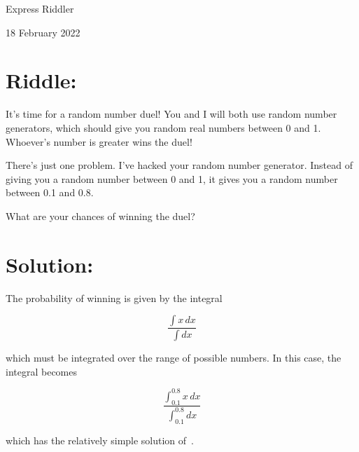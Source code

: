 \documentclass{article}
\begin{document}
\pagestyle{empty} %

\begin{center}
{\LARGE Express Riddler}

\vspace{0.15in}

{\Large 18 February 2022}
\end{center}


\section*{Riddle:}

It's time for a random number duel! You and I will both use random number generators, which should give you random real numbers between 0 and 1.
Whoever's number is greater wins the duel!

There's just one problem.
I've hacked your random number generator.
Instead of giving you a random number between 0 and 1, it gives you a random number between 0.1 and 0.8.

What are your chances of winning the duel?


\section*{Solution:}

The probability of winning is given by the integral

\[
\frac{\int x\,dx}{\int dx}
\]

which must be integrated over the range of possible numbers.
In this case, the integral becomes

\[
\frac{\int_{0.1}^{0.8} x\,dx}{\int_{0.1}^{0.8} dx}
\]

which has the relatively simple solution of \,.
\end{document}
